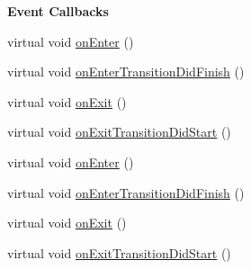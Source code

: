 \begin{Indent}\textbf{ Event Callbacks}\par
\begin{DoxyCompactItemize}
\item 
virtual void \hyperlink{classNode_a7f51764c4afd5018a052b9ef71c03374}{on\+Enter} ()
\item 
virtual void \hyperlink{classNode_afef4b2a863042a9ea456e952cf26991d}{on\+Enter\+Transition\+Did\+Finish} ()
\item 
virtual void \hyperlink{classNode_ac83de835ea315e3179d4293acd8903ac}{on\+Exit} ()
\item 
virtual void \hyperlink{classNode_a11686054c0d2edd292a53aa9702aaece}{on\+Exit\+Transition\+Did\+Start} ()
\item 
virtual void \hyperlink{classNode_adde49eb69aebd860d7b95bf484cd96f3}{on\+Enter} ()
\item 
virtual void \hyperlink{classNode_aa3a941a5ea551c52408a8f3df4a64e6f}{on\+Enter\+Transition\+Did\+Finish} ()
\item 
virtual void \hyperlink{classNode_ae97adc8e1de122017736546f33b01455}{on\+Exit} ()
\item 
virtual void \hyperlink{classNode_a14c2a4fe52123f1e928041a961eb679d}{on\+Exit\+Transition\+Did\+Start} ()
\end{DoxyCompactItemize}
\end{Indent}
